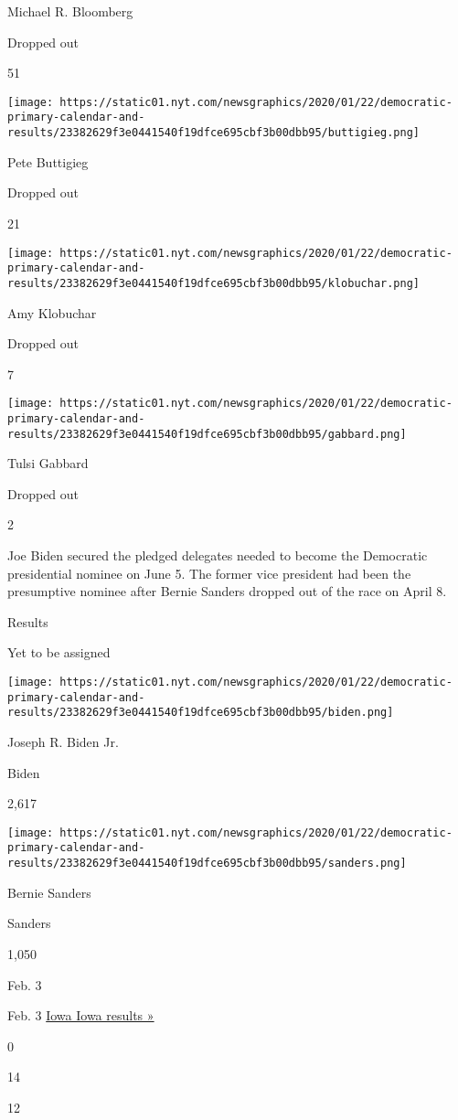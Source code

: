 Michael R. Bloomberg

Dropped out

51

\texttt{[image: https://static01.nyt.com/newsgraphics/2020/01/22/democratic-primary-calendar-and-results/23382629f3e0441540f19dfce695cbf3b00dbb95/buttigieg.png]}

Pete Buttigieg

Dropped out

21

\texttt{[image: https://static01.nyt.com/newsgraphics/2020/01/22/democratic-primary-calendar-and-results/23382629f3e0441540f19dfce695cbf3b00dbb95/klobuchar.png]}

Amy Klobuchar

Dropped out

7

\texttt{[image: https://static01.nyt.com/newsgraphics/2020/01/22/democratic-primary-calendar-and-results/23382629f3e0441540f19dfce695cbf3b00dbb95/gabbard.png]}

Tulsi Gabbard

Dropped out

2

Joe Biden secured the pledged delegates needed to become the Democratic
presidential nominee on June 5. The former vice president had been the
presumptive nominee after Bernie Sanders dropped out of the race on
April 8.

Results

Yet to be assigned

\texttt{[image: https://static01.nyt.com/newsgraphics/2020/01/22/democratic-primary-calendar-and-results/23382629f3e0441540f19dfce695cbf3b00dbb95/biden.png]}

Joseph R. Biden Jr.

Biden

2,617

\texttt{[image: https://static01.nyt.com/newsgraphics/2020/01/22/democratic-primary-calendar-and-results/23382629f3e0441540f19dfce695cbf3b00dbb95/sanders.png]}

Bernie Sanders

Sanders

1,050

Feb. 3

Feb. 3
\href{https://www.nytimes.com/interactive/2020/02/04/us/elections/results-iowa-caucus.html}{Iowa
Iowa results »}

0

14

12

